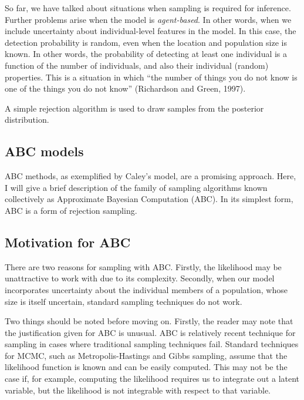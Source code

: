 \documentclass[
]{book}
\begin{document}
So far, we have talked about situations when sampling is required for inference. Further problems arise when the model is \emph{agent-based}. In other words, when we include uncertainty about individual-level features in the model. In this case, the detection probability is random, even when the location and population size is known. In other words, the probability of detecting at least one individual is a function of the number of individuals, and also their individual (random) properties. This is a situation in which ``the number of things you do not know is one of the things you do not know'' (Richardson and Green, 1997).

A simple rejection algorithm is used to draw samples from the posterior distribution.

\hypertarget{abc-models}{%
\subsection{ABC models}\label{abc-models}}

ABC methods, as exemplified by Caley's model, are a promising approach. Here, I will give a brief description of the family of sampling algorithms known collectively as Approximate Bayesian Computation (ABC). In its simplest form, ABC is a form of rejection sampling.

\hypertarget{motivation-for-abc}{%
\subsection{Motivation for ABC}\label{motivation-for-abc}}

There are two reasons for sampling with ABC. Firstly, the likelihood may be unattractive to work with due to its complexity. Secondly, when our model incorporates uncertainty about the individual members of a population, whose size is itself uncertain, standard sampling techniques do not work.

Two things should be noted before moving on. Firstly, the reader may note that the justification given for ABC is unusual. ABC is relatively recent technique for sampling in cases where traditional sampling techniques fail. Standard techniques for MCMC, such as Metropolis-Hastings and Gibbs sampling, assume that the likelihood function is known and can be easily computed. This may not be the case if, for example, computing the likelihood requires us to integrate out a latent variable, but the likelihood is not integrable with respect to that variable.
\end{document}
